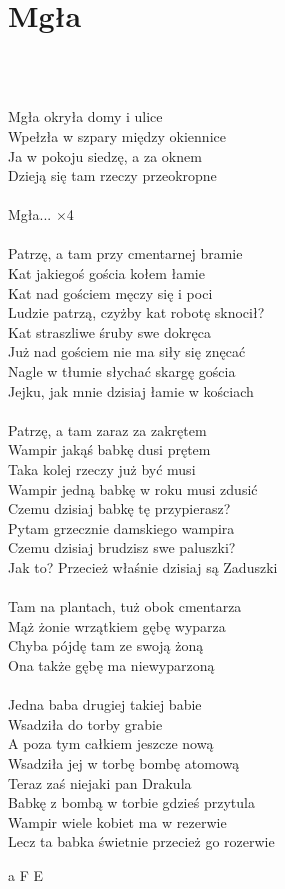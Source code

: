 \documentclass[a5paper, 10pt]{book}
\begin{document}
\section{Mgła}\textcolor{lightgray}{\textit{}}\\~\\
\begin{minipage}[t]{0.8\textwidth}
Mgła okryła domy i ulice\\
Wpełzła w szpary między okiennice\\
Ja w pokoju siedzę, a za oknem\\
Dzieją się tam rzeczy przeokropne\\
\\
Mgła... $\times$4\\
\\
Patrzę, a tam przy cmentarnej bramie\\
Kat jakiegoś gościa kołem łamie\\
Kat nad gościem męczy się i poci\\
Ludzie patrzą, czyżby kat robotę sknocił?\\
Kat straszliwe śruby swe dokręca\\
Już nad gościem nie ma siły się znęcać\\
Nagle w tłumie słychać skargę gościa\\
Jejku, jak mnie dzisiaj łamie w kościach\\
\\
Patrzę, a tam zaraz za zakrętem\\
Wampir jakąś babkę dusi prętem\\
Taka kolej rzeczy już być musi\\
Wampir jedną babkę w roku musi zdusić\\
Czemu dzisiaj babkę tę przypierasz?\\
Pytam grzecznie damskiego wampira\\
Czemu dzisiaj brudzisz swe paluszki?\\
Jak to? Przecież właśnie dzisiaj są Zaduszki\\
\\
Tam na plantach, tuż obok cmentarza\\
Mąż żonie wrzątkiem gębę wyparza\\
Chyba pójdę tam ze swoją żoną\\
Ona także gębę ma niewyparzoną\\
\\
Jedna baba drugiej takiej babie\\
Wsadziła do torby grabie\\
A poza tym całkiem jeszcze nową\\
Wsadziła jej w torbę bombę atomową\\
Teraz zaś niejaki pan Drakula\\
Babkę z bombą w torbie gdzieś przytula\\
Wampir wiele kobiet ma w rezerwie\\
Lecz ta babka świetnie przecież go rozerwie\\
\end{minipage}
\begin{minipage}[t]{0.2\textwidth}
a F E\\
\end{minipage}
\end{document}
